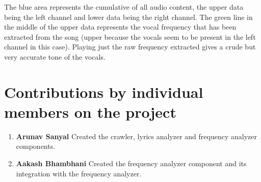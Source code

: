\documentclass[letterpaper, 11pt]{article}
\begin{document}
\begin{enumerate}
The blue area represents the cumulative of all audio content, the upper data being the left channel and lower data being the right channel. The green line in the middle of the upper data represents the vocal frequency that has been extracted from the song (upper because the vocals seem to be present in the left channel in this case). Playing just the raw frequency extracted gives a crude but very accurate tone of the vocals.
\end{enumerate}

\section*{Contributions by individual members on the project}
\begin{enumerate}
\item \textbf{Arunav Sanyal} Created the crawler, lyrics analyzer and frequency analyzer components.
\item \textbf{Aakash Bhambhani} Created the frequency analyzer component and its integration with the frequency analyzer.  
\end{enumerate}
\end{document}
